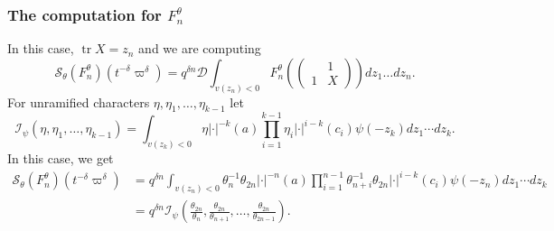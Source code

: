 \documentclass{amsart}
\theoremstyle{definition}
\newcommand{\tr}{\operatorname{tr}}
\begin{document}
{\subsubsection{The computation for $F_n^\theta$}\label{ss:shalikaFn}
In this case, $\tr X=z_n$ and we are computing
\begin{equation}\label{eq:Fn}\mathcal{S}_\theta(F^\theta_n)(t^{-\delta}\varpi^\delta )=q^{\delta n}\mathcal{D}\int_{v(z_n)<0} F^\theta_n \left(\begin{pmatrix}&1\\1&X\end{pmatrix}\right)dz_1\ldots dz_n.
\end{equation}
For unramified characters $\eta,\eta_1,\ldots, \eta_{k-1}$ let
\[\mathcal{I}_\psi(\eta,\eta_1,\ldots,\eta_{k-1})=\int_{v(z_k)<0}\eta|\cdot|^{-k}(a)\prod_{i=1}^{k-1}\eta_i|\cdot|^{i-k}(c_i)\psi(-z_k)dz_1\cdots
dz_k.\]
In this case, we get
\begin{align*}
\mathcal{S}_\theta(F^\theta_n)(t^{-\delta}\varpi^\delta )
  &=q^{\delta n}\int_{v(z_n)<0}\theta_n^{-1}\theta_{2n}|\cdot|^{-n}(a)\prod_{i=1}^{n-1}\theta_{n+i}^{-1}\theta_{2n}|\cdot|^{i-k}(c_i)\psi(-z_n)dz_1\cdots
    dz_k\\
  &=q^{\delta n}\mathcal{I}_\psi\left(\frac{\theta_{2n}}{\theta_n},\frac{\theta_{2n}}{\theta_{n+1}},\ldots,\frac{\theta_{2n}}{\theta_{2n-1}}\right).
\end{align*}

}
\end{document}
